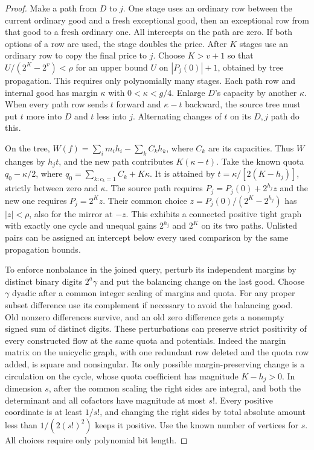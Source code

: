 \documentclass[11pt,oneside,openany,notitlepage]{report}
\begin{document}
\begin{proof}
Make a path from \(D\) to \(j\). One stage uses an ordinary row between
the current ordinary good and a fresh exceptional good, then an exceptional
row from that good to a fresh ordinary one. All intercepts on the path
are zero. If both options of a row are used, the stage doubles the price.
After \(K\) stages use an ordinary row to copy the final price to \(j\).
Choose \(K>v+1\) so that \(U/(2^K-2^v)<\rho\) for an upper bound \(U\)
on \(|P_j(0)|+1\), obtained by tree propagation. This requires only
polynomially many stages. Each path row and internal good has margin
\(\kappa\) with \(0<\kappa<g/4\). Enlarge \(D\)'s capacity by another
\(\kappa\). When every path row sends \(t\) forward and \(\kappa-t\)
backward, the source tree must put \(t\) more into \(D\) and \(t\) less
into \(j\). Alternating changes of \(t\) on its \(D,j\) path do this.

On the tree, \(W(f)=\sum_i m_ih_i-\sum_k C_kh_k\), where \(C_k\)
are its capacities. Thus \(W\) changes by \(h_jt\), and the new path
contributes \(K(\kappa-t)\). Take the known quota \(q_0-\kappa/2\),
where \(q_0=\sum_{k:c_k=1} C_k+K\kappa\).
It is attained by \(t=\kappa/[2(K-h_j)]\), strictly between zero and
\(\kappa\). The source path requires \(P_j=P_j(0)+2^{h_j}z\) and the
new one requires \(P_j=2^Kz\). Their common choice
\(z=P_j(0)/(2^K-2^{h_j})\) has \(|z|<\rho\), also for the mirror
at \(-z\). This exhibits a connected positive tight graph with exactly
one cycle and unequal gains \(2^{h_j}\) and \(2^K\) on its two paths.
Unlisted pairs can be assigned an intercept below every used comparison
by the same propagation bounds.

To enforce nonbalance in the joined query, perturb its independent
margins by distinct binary digits \(2^a\gamma\) and put the balancing
change on the last good. Choose \(\gamma\) dyadic after a common integer
scaling of margins and quota. For any proper subset difference use its
complement if necessary to avoid the balancing good. Old nonzero
differences survive, and an old zero difference gets a nonempty signed
sum of distinct digits. These perturbations can preserve strict
positivity of every constructed flow at the same quota and potentials.
Indeed the margin matrix on the unicyclic graph, with one redundant
row deleted and the quota row added, is square and nonsingular. Its
only possible margin-preserving change is a circulation on the cycle,
whose quota coefficient has magnitude \(K-h_j>0\). In dimension \(s\),
after the common scaling the right sides are integral, and both the
determinant and all cofactors have magnitude at most \(s!\). Every
positive coordinate is at least \(1/s!\), and changing the right sides
by total absolute amount less than \(1/(2(s!)^2)\) keeps it positive.
Use the known number of vertices for \(s\). All choices require only
polynomial bit length.


\end{proof}
\end{document}
